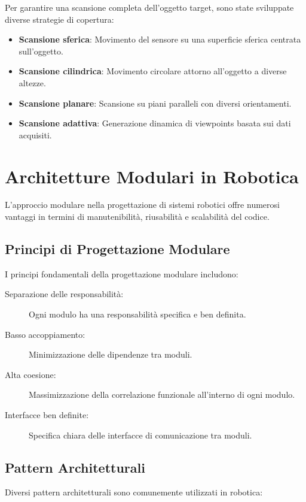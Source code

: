 \documentclass[12pt,a4paper,twoside,openright]{book}
\begin{document}
Per garantire una scansione completa dell'oggetto target, sono state sviluppate diverse strategie di copertura:

\begin{itemize}
    \item \textbf{Scansione sferica}: Movimento del sensore su una superficie sferica centrata sull'oggetto.
    \item \textbf{Scansione cilindrica}: Movimento circolare attorno all'oggetto a diverse altezze.
    \item \textbf{Scansione planare}: Scansione su piani paralleli con diversi orientamenti.
    \item \textbf{Scansione adattiva}: Generazione dinamica di viewpoints basata sui dati acquisiti.
\end{itemize}

\section{Architetture Modulari in Robotica}

L'approccio modulare nella progettazione di sistemi robotici offre numerosi vantaggi in termini di manutenibilità, riusabilità e scalabilità del codice.

\subsection{Principi di Progettazione Modulare}

I principi fondamentali della progettazione modulare includono:

\begin{description}
    \item[Separazione delle responsabilità:] Ogni modulo ha una responsabilità specifica e ben definita.
    \item[Basso accoppiamento:] Minimizzazione delle dipendenze tra moduli.
    \item[Alta coesione:] Massimizzazione della correlazione funzionale all'interno di ogni modulo.
    \item[Interfacce ben definite:] Specifica chiara delle interfacce di comunicazione tra moduli.
\end{description}

\subsection{Pattern Architetturali}

Diversi pattern architetturali sono comunemente utilizzati in robotica:
\end{document}
